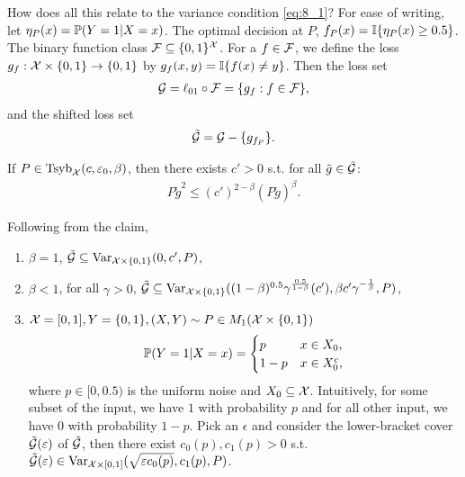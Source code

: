 \documentclass[twoside]{article}
\begin{document}
How does all this relate to the variance condition \cref{eq:8_1}?  For ease of writing, let $\eta_P(x) = \mathbb{P}(Y= 1 | X=x)$.  The optimal decision at $P$, $f_P(x) = \mathbb{I}\{ \eta_P(x) \geq 0.5 \}$.  The binary function class $\mathcal{F} \subseteq \{0, 1\}^{\mathcal{X}}$.  For a $f \in \mathcal{F}$, we define the loss $g_f: \mathcal{X} \times \{0,1\} \to\{ 0, 1\}$ by $g_f(x,y) = \mathbb{I}\{f(x) \neq y\}$.  Then the loss set
\begin{align}
    \mathcal{G} = \ell_{01} \circ \mathcal{F} = \{g_f : f \in \mathcal{F} \},
\end{align}
and the shifted loss set 
\begin{align}
    \tilde {\mathcal{G}} = \mathcal{G} - \{g_{f_P}\}.
\end{align}
\begin{claim}   
    If $P \in \mathrm{Tsyb}_{\mathcal{X}}(c, \varepsilon_0, \beta)$, then there exists $c' > 0$ s.t. for all $\tilde g \in \tilde {\mathcal{G}}$:
    \begin{align}
        P \tilde g^2 \leq (c')^{2 - \beta} ( P\tilde g)^{\beta}.
    \end{align}
\end{claim}
Following from the claim,  
\begin{enumerate}
    \item $\beta = 1$, $\tilde {\mathcal{G}} \subseteq \operatorname{Var}_{\mathcal{X} \times \{0,1\}}(0, c', P)$, \\
    \item $\beta < 1$, for all $\gamma > 0$,
    $\tilde {\mathcal{G}} \subseteq \operatorname{Var}_{\mathcal{X} \times \{0,1\}}((1-\beta)^{0.5} \gamma^{\frac{0.5}{1-\beta}}(c'), \beta c' \gamma^{-\frac{1}{\beta}}, P)$, \\
    \item $\mathcal{X} = [0,1], Y = \{0, 1\}, (X,Y) \sim P \in M_1(\mathcal{X} \times \{0,1\})$ 
    \begin{align}
        \mathbb{P}(Y=1 | X = x) = \begin{cases}
            p & x \in X_0, \\
            1-p & x \in X_0^c,
        \end{cases}
    \end{align}
    where $p \in [0, 0.5)$ is the uniform noise and $X_0 \subseteq \mathcal{X}$.  Intuitively, for some subset of the input, we have $1$ with probability $p$ and for all other input, we have $0$ with probability $1-p$.  Pick an $\epsilon$ and consider the lower-bracket cover $\tilde {\mathcal{G}}(\varepsilon)$ of $\tilde {\mathcal{G}}$, then there exist $c_0(p), c_1(p)> 0$ s.t. $\tilde {\mathcal{G}}(\varepsilon) \in \operatorname{Var}_{\mathcal{X} \times [0,1]}( \sqrt{\varepsilon c_0(p)}, c_1(p), P)$.  
\end{enumerate}
\end{document}
